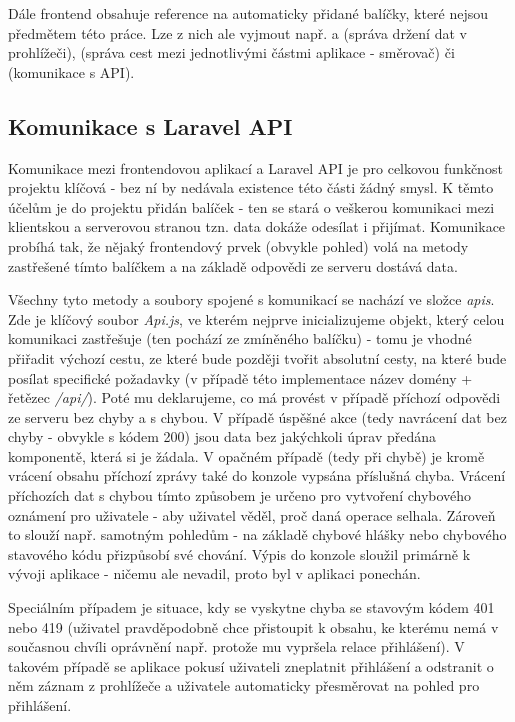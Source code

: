 		Dále frontend obsahuje reference na automaticky přidané balíčky, které nejsou předmětem této práce. Lze z nich ale vyjmout např.  a  (správa držení dat v prohlížeči),  (správa cest mezi jednotlivými částmi aplikace - směrovač) či  (komunikace s API).
	
	\subsection{Komunikace s Laravel API}
	Komunikace mezi frontendovou aplikací a Laravel API je pro celkovou funkčnost projektu klíčová - bez ní by nedávala existence této části žádný smysl. K těmto účelům je do projektu přidán balíček  - ten se stará o veškerou komunikaci mezi klientskou a serverovou stranou tzn. data dokáže odesílat i přijímat. Komunikace probíhá tak, že nějaký frontendový prvek (obvykle pohled) volá na metody zastřešené tímto balíčkem a na základě odpovědi ze serveru dostává data.
	
	Všechny tyto metody a soubory spojené s komunikací se nachází ve složce \textit{apis}. Zde je klíčový soubor \textit{Api.js}, ve kterém nejprve inicializujeme objekt, který celou komunikaci zastřešuje (ten pochází ze zmíněného balíčku) - tomu je vhodné přiřadit výchozí cestu, ze které bude později tvořit absolutní cesty, na které bude posílat specifické požadavky (v případě této implementace název domény + řetězec \textit{/api/}). Poté mu deklarujeme, co má provést v případě příchozí odpovědi ze serveru bez chyby a s chybou. V případě úspěšné akce (tedy navrácení dat bez chyby - obvykle s kódem 200) jsou data bez jakýchkoli úprav předána komponentě, která si je žádala. V opačném případě (tedy při chybě) je kromě vrácení obsahu příchozí zprávy také do konzole vypsána příslušná chyba. Vrácení příchozích dat s chybou tímto způsobem je určeno pro vytvoření chybového oznámení pro uživatele - aby uživatel věděl, proč daná operace selhala. Zároveň to slouží např. samotným pohledům - na základě chybové hlášky nebo chybového stavového kódu přizpůsobí své chování. Výpis do konzole sloužil primárně k vývoji aplikace - ničemu ale nevadil, proto byl v aplikaci ponechán. 
	
	Speciálním případem je situace, kdy se vyskytne chyba se stavovým kódem 401 nebo 419 (uživatel pravděpodobně chce přistoupit k obsahu, ke kterému nemá v současnou chvíli oprávnění např. protože mu vypršela relace přihlášení). V takovém případě se aplikace pokusí uživateli zneplatnit přihlášení a odstranit o něm záznam z prohlížeče a uživatele automaticky přesměrovat na pohled pro přihlášení.
	
